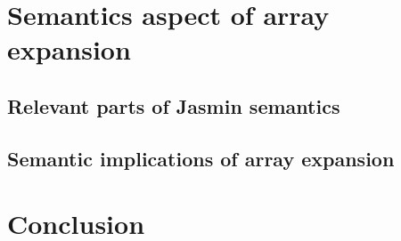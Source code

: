 \documentclass{article}
\begin{document}
\section{Semantics aspect of array expansion}\label{sec:semantics}

\subsection{Relevant parts of Jasmin semantics}


\subsection{Semantic implications of array expansion}



\section{}

\section{Conclusion}
\end{document}
